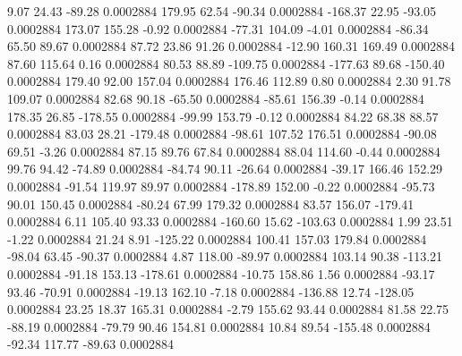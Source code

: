        9.07       24.43      -89.28     0.0002884
      179.95       62.54      -90.34     0.0002884
     -168.37       22.95      -93.05     0.0002884
      173.07      155.28       -0.92     0.0002884
      -77.31      104.09       -4.01     0.0002884
      -86.34       65.50       89.67     0.0002884
       87.72       23.86       91.26     0.0002884
      -12.90      160.31      169.49     0.0002884
       87.60      115.64        0.16     0.0002884
       80.53       88.89     -109.75     0.0002884
     -177.63       89.68     -150.40     0.0002884
      179.40       92.00      157.04     0.0002884
      176.46      112.89        0.80     0.0002884
        2.30       91.78      109.07     0.0002884
       82.68       90.18      -65.50     0.0002884
      -85.61      156.39       -0.14     0.0002884
      178.35       26.85     -178.55     0.0002884
      -99.99      153.79       -0.12     0.0002884
       84.22       68.38       88.57     0.0002884
       83.03       28.21     -179.48     0.0002884
      -98.61      107.52      176.51     0.0002884
      -90.08       69.51       -3.26     0.0002884
       87.15       89.76       67.84     0.0002884
       88.04      114.60       -0.44     0.0002884
       99.76       94.42      -74.89     0.0002884
      -84.74       90.11      -26.64     0.0002884
      -39.17      166.46      152.29     0.0002884
      -91.54      119.97       89.97     0.0002884
     -178.89      152.00       -0.22     0.0002884
      -95.73       90.01      150.45     0.0002884
      -80.24       67.99      179.32     0.0002884
       83.57      156.07     -179.41     0.0002884
        6.11      105.40       93.33     0.0002884
     -160.60       15.62     -103.63     0.0002884
        1.99       23.51       -1.22     0.0002884
       21.24        8.91     -125.22     0.0002884
      100.41      157.03      179.84     0.0002884
      -98.04       63.45      -90.37     0.0002884
        4.87      118.00      -89.97     0.0002884
      103.14       90.38     -113.21     0.0002884
      -91.18      153.13     -178.61     0.0002884
      -10.75      158.86        1.56     0.0002884
      -93.17       93.46      -70.91     0.0002884
      -19.13      162.10       -7.18     0.0002884
     -136.88       12.74     -128.05     0.0002884
       23.25       18.37      165.31     0.0002884
       -2.79      155.62       93.44     0.0002884
       81.58       22.75      -88.19     0.0002884
      -79.79       90.46      154.81     0.0002884
       10.84       89.54     -155.48     0.0002884
      -92.34      117.77      -89.63     0.0002884
